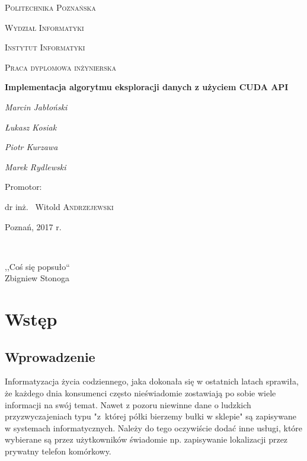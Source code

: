 \documentclass[12pt]{article}
\begin{document}
\begin{titlepage}
	\centering
	{\scshape\LARGE Politechnika Poznańska \par}
	{\scshape\LARGE Wydział Informatyki \par}
	{\scshape\LARGE Instytut Informatyki \par}
	\vspace{1cm}
	{\scshape\Large Praca dyplomowa inżynierska\par}
	\vspace{1.5cm}
	{\huge\bfseries Implementacja algorytmu eksploracji danych z użyciem CUDA API\par}
	\vspace{2cm}
	{\Large\itshape Marcin Jabłoński \par}
	{\Large\itshape Łukasz Kosiak \par}
	{\Large\itshape Piotr Kurzawa \par}
	{\Large\itshape Marek Rydlewski \par}
	\vfill
	\begin{flushright}
	Promotor:\par
	dr inż. ~Witold \textsc{Andrzejewski}
	\end{flushright}
	\vfill
	{\large Poznań, 2017 r.\par}
\end{titlepage}
\thispagestyle{empty} %
$\mbox{ }$
\vfill\vfill
\hfill
\begin{flushright}
\begin{em}
,,Coś się popsuło`` \\
Zbigniew Stonoga
\end{em}
\end{flushright}
\vfill\pagebreak
\tableofcontents
\newpage

\section{Wstęp}

\subsection{Wprowadzenie}
Informatyzacja życia codziennego, jaka dokonała się w ostatnich latach sprawiła, że każdego dnia konsumenci często nieświadomie zostawiają po sobie wiele informacji na swój temat. Nawet z pozoru niewinne dane o ludzkich przyzwyczajeniach typu "z~której półki bierzemy bułki w sklepie" są zapisywane w systemach informatycznych. Należy do tego oczywiście dodać inne usługi, które wybierane są przez użytkowników świadomie np. zapisywanie lokalizacji przez prywatny telefon komórkowy.
\end{document}
